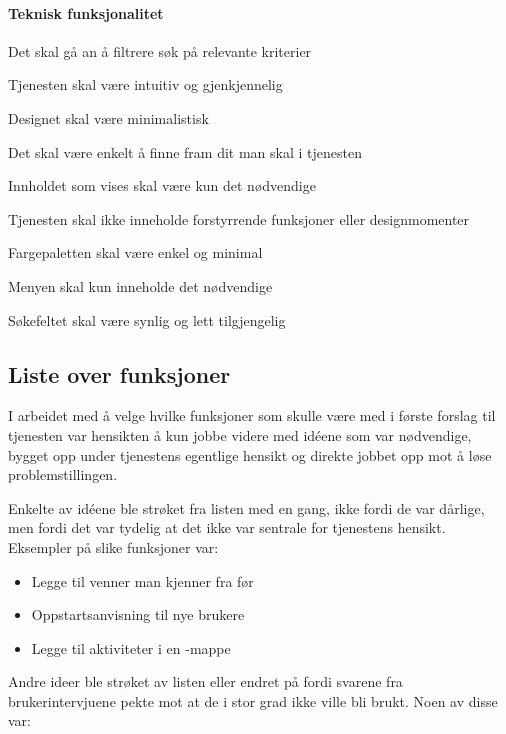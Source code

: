 \paragraph{Teknisk funksjonalitet}
\begin{compactitem}
\item Det skal gå an å filtrere søk på relevante kriterier
\item Tjenesten skal være intuitiv og gjenkjennelig
\item Designet skal være minimalistisk
\item Det skal være enkelt å finne fram dit man skal i tjenesten
\item Innholdet som vises skal være kun det nødvendige
\item Tjenesten skal ikke inneholde forstyrrende funksjoner eller designmomenter
\item Fargepaletten skal være enkel og minimal
\item Menyen skal kun inneholde det nødvendige
\item Søkefeltet skal være synlig og lett tilgjengelig
\end{compactitem}

\subsection{Liste over funksjoner}
\label{section:forslag1-liste-over-funksjoner}
I arbeidet med å velge hvilke funksjoner som skulle være med i første forslag til tjenesten var hensikten å kun jobbe videre med idéene som var nødvendige, bygget opp under tjenestens egentlige hensikt og direkte jobbet opp mot å løse problemstillingen.

Enkelte av idéene ble strøket fra listen med en gang, ikke fordi de var dårlige, men fordi det var tydelig at det ikke var sentrale for tjenestens hensikt. Eksempler på slike funksjoner var:

\begin{itemize}
    \item Legge til venner man kjenner fra før
    \item Oppstartsanvisning til nye brukere
    \item Legge til aktiviteter i en -mappe
\end{itemize}

Andre ideer ble strøket av listen eller endret på fordi svarene fra brukerintervjuene pekte mot at de i stor grad ikke ville bli brukt. Noen av disse var:

